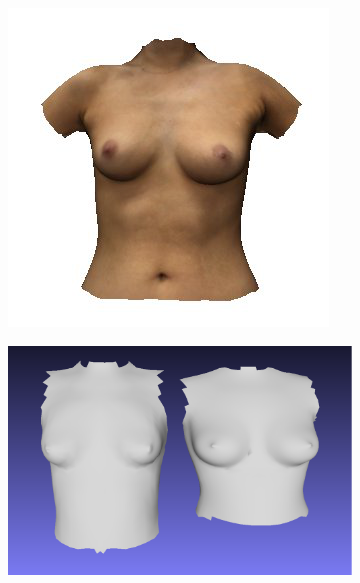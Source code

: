 \begin{figure}
\centering
\begin{subfigure}{.25\textwidth}
  \centering
  \includegraphics[width=1.05\linewidth]{figures/sprite57}
\end{subfigure}%
\begin{subfigure}{.37\textwidth}
  \centering
  \includegraphics[width=1.1\linewidth]{figures/fitted57_cropped}
\end{subfigure}
\begin{subfigure}{.37\textwidth}
  \centering

\end{subfigure}
\end{figure}
